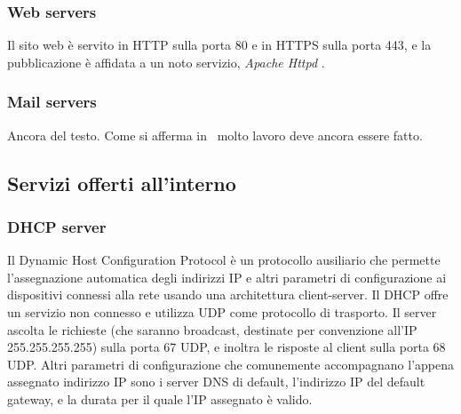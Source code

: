 \subsubsection{Web servers}
Il sito web è servito in HTTP sulla porta 80 e in HTTPS sulla porta 443, e la pubblicazione è affidata a un noto servizio, \emph{Apache Httpd} \cite{APACHE}.
\subsubsection{Mail servers}
Ancora del testo. Come si afferma in~\cite{jones96analysis} molto lavoro deve ancora essere fatto.

\subsection{Servizi offerti all'interno}
\subsubsection{DHCP server}
Il Dynamic Host Configuration Protocol \cite[RFC2131]{RFC2131} è un protocollo ausiliario che permette l'assegnazione automatica degli indirizzi IP e altri parametri di configurazione ai dispositivi connessi alla rete usando una architettura client-server.
Il DHCP offre un servizio non connesso e utilizza UDP come protocollo di trasporto. Il server ascolta le richieste (che saranno broadcast, destinate per convenzione all'IP 255.255.255.255) sulla porta 67 UDP, e inoltra le risposte al client sulla porta 68 UDP.
Altri parametri di configurazione che comunemente accompagnano l'appena assegnato indirizzo IP sono i server DNS \cite[RFC1034]{RFC1034} di default, l'indirizzo IP del default gateway, e la durata per il quale l'IP assegnato è valido.

